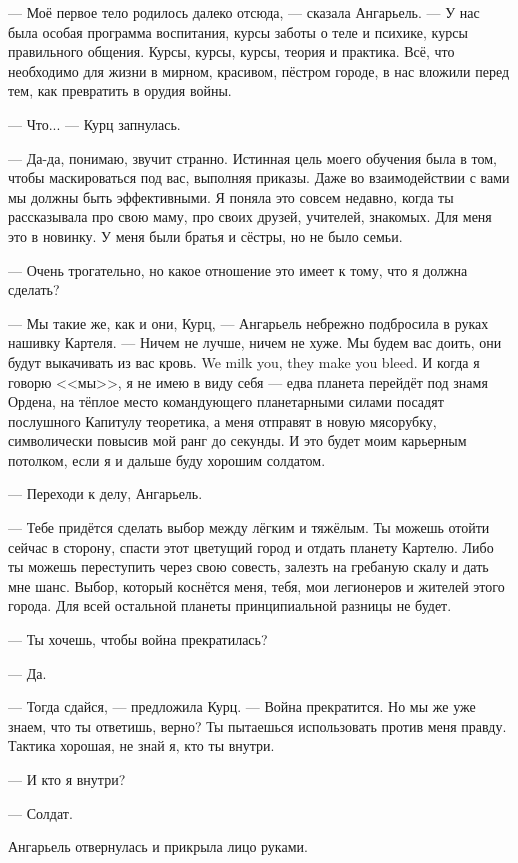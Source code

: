 --- Моё первое тело родилось далеко отсюда, --- сказала Ангарьель.
--- У нас была особая программа воспитания, курсы заботы о теле и психике, курсы правильного общения.
Курсы, курсы, курсы, теория и практика.
Всё, что необходимо для жизни в мирном, красивом, пёстром городе, в нас вложили перед тем, как превратить в орудия войны.

--- Что... --- Курц запнулась.

--- Да-да, понимаю, звучит странно.
Истинная цель моего обучения была в том, чтобы маскироваться под вас, выполняя приказы.
Даже во взаимодействии с вами мы должны быть эффективными.
Я поняла это совсем недавно, когда ты рассказывала про свою маму, про своих друзей, учителей, знакомых.
Для меня это в новинку.
У меня были братья и сёстры, но не было семьи.

--- Очень трогательно, но какое отношение это имеет к тому, что я должна сделать?

--- Мы такие же, как и они, Курц, --- Ангарьель небрежно подбросила в руках нашивку Картеля.
--- Ничем не лучше, ничем не хуже.
{Мы будем вас доить, они будут выкачивать из вас кровь.}
{We milk you, they make you bleed.}
И когда я говорю <<мы>>, я не имею в виду себя --- едва планета перейдёт под знамя Ордена, на тёплое место командующего планетарными силами посадят послушного Капитулу теоретика, а меня отправят в новую мясорубку, символически повысив мой ранг до секунды.
И это будет моим карьерным потолком, если я и дальше буду хорошим солдатом.

--- Переходи к делу, Ангарьель.

--- Тебе придётся сделать выбор между лёгким и тяжёлым.
Ты можешь отойти сейчас в сторону, спасти этот цветущий город и отдать планету Картелю.
Либо ты можешь переступить через свою совесть, залезть на гребаную скалу и дать мне шанс.
Выбор, который коснётся меня, тебя, мои легионеров и жителей этого города.
Для всей остальной планеты принципиальной разницы не будет.

--- Ты хочешь, чтобы война прекратилась?

--- Да.

--- Тогда сдайся, --- предложила Курц.
--- Война прекратится.
Но мы же уже знаем, что ты ответишь, верно?
Ты пытаешься использовать против меня правду.
Тактика хорошая, не знай я, кто ты внутри.

--- И кто я внутри?

--- Солдат.

Ангарьель отвернулась и прикрыла лицо руками.

